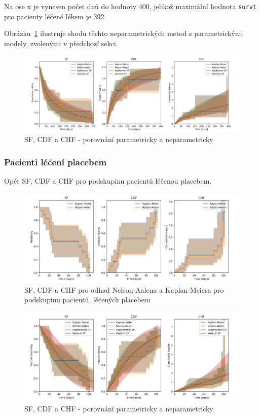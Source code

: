 \documentclass[a4, 11pt]{article}
\theoremstyle{definition}
\theoremstyle{remark}
\begin{document}
    Na ose x je vynesen počet dnů do hodnoty 400, jelikož maximální hodnota \texttt{survt} pro pacienty léčené lékem je 392.
    
    Obrázku~\ref{fig:four_men_drugs_compared_to_parametrics} ilustruje shodu těchto neparametrických metod s parametrickými modely, zvolenými v předchozí sekci.
    
	\begin{figure}[H]
        \centering
        \includegraphics[width=0.9\linewidth]{img/four_men_drugs_compared_to_parametrics.png}
        \caption{SF, CDF a CHF - porovnání parametricky a neparametricky}
        \label{fig:four_men_drugs_compared_to_parametrics}
    \end{figure}

	
	
	\subsubsection{Pacienti léčení placebem} \label{sec:non_parametric_placebo}
	Opět SF, CDF a CHF pro podskupinu pacientů léčenou placebem.
    
	\begin{figure}[H]
		\centering
		\includegraphics[width=0.9\linewidth]{img/four_men_placebo.png}
		\caption{SF, CDF a CHF pro odhad Nelson-Aalena a Kaplan-Meiera pro podskupinu pacientů, léčených placebem}
		\label{fig:four_men_placebo}
	\end{figure}

	\begin{figure}[H]
    	\centering
    	\includegraphics[width=0.9\linewidth]{img/four_men_placebo_compared_to_parametrics.png}
    	\caption{SF, CDF a CHF - porovnání parametricky a neparametricky}
    	\label{fig:four_men_placebo_comp_to_parametrics}
    \end{figure}
	
\end{document}
